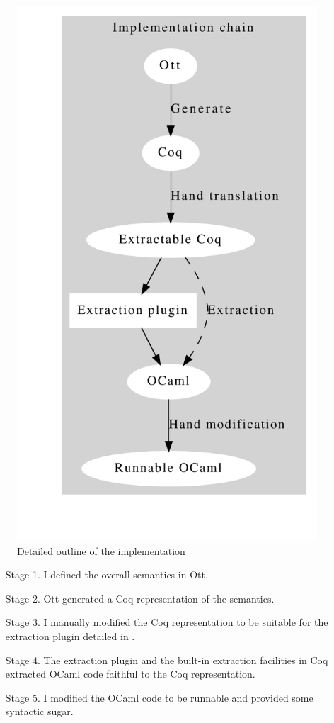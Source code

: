 \documentclass[12pt,twoside,notitlepage]{report}
\theoremstyle{plain}%
\theoremstyle{definition}
\theoremstyle{remark}
\begin{document}
\begin{figure}[h]
\begin{center}
\includegraphics[scale=0.5]{implOut}
\caption{Detailed outline of the implementation}
\label{fig:detailedimploutline}
\end{center}
\end{figure}

\begin{enumerate}
\item[Stage 1.]{I defined the overall semantics in Ott.}
\item[Stage 2.]{Ott generated a Coq representation of the semantics.}
\item[Stage 3.]{I manually modified the Coq representation to be suitable for the extraction plugin detailed in .}
\item[Stage 4.]{The extraction plugin and the built-in extraction facilities in Coq extracted OCaml code faithful to the Coq representation.}
\item[Stage 5.]{I modified the OCaml code to be runnable and provided some syntactic sugar.}
\end{enumerate}
\end{document}
